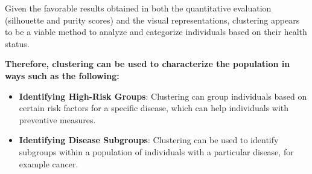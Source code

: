 \documentclass[12pt]{article}
\begin{document}
\begin{enumerate}[leftmargin=\labelsep]
        Given the favorable results obtained in both the quantitative evaluation (silhouette and purity scores) and the visual representations, clustering appears to be a viable method to analyze and categorize individuals based on their health status.
        
        \textbf{Therefore, clustering can be used to characterize the population in ways such as the following:}
        
        \begin{itemize}
            \item \textbf{Identifying High-Risk Groups}: Clustering can group individuals based on certain risk factors for a specific disease, which can help individuals with preventive measures. 
        
            \item \textbf{Identifying Disease Subgroups}: Clustering can be used to identify subgroups within a population of individuals with a particular disease, for example cancer. 
        \end{itemize}

\end{enumerate}
\end{document}
